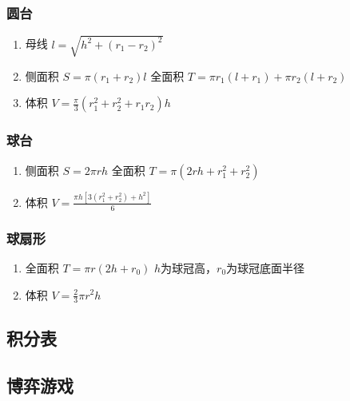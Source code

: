 \documentclass[landscape,twocolumn,a4paper]{article}
\begin{document}
	\subsubsection*{圆台}

	\begin{enumerate}
		\item 母线
		$l=\sqrt{h^2+(r_1-r_2)^2}$
		\item 侧面积
		$S=\pi(r_1+r_2)l$    全面积
		$T=\pi r_1(l+r_1)+\pi r_2(l+r_2)$
		\item 体积
		$V=\frac{\pi}{3}(r_1^2+r_2^2+r_1r_2)h$
	\end{enumerate}

	\subsubsection*{球台}

	\begin{enumerate}
		\item 侧面积
		$S=2\pi rh$   全面积
		$T=\pi(2rh+r_1^2+r_2^2)$
		\item 体积
		$V=\frac{\pi h[3(r_1^2+r_2^2)+h^2]}{6}$
	\end{enumerate}

	\subsubsection*{球扇形}

	\begin{enumerate}
		\item 全面积
		$T=\pi r(2h+r_0)$
		$h$为球冠高，$r_0$为球冠底面半径
		\item 体积
		$V=\frac{2}{3}\pi r^2h$
	\end{enumerate}

	\subsection{积分表}
	

	\subsection{博弈游戏}
	
\end{document}
